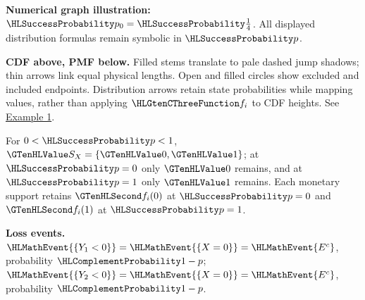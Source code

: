 {\begin{center}
\end{center}
\textbf{Numerical graph illustration:} $\SuccessProb{p_0}=\SuccessProb{\frac{1}{4}}$. All displayed distribution formulas remain symbolic in $\SuccessProb{p}$.
\par\textbf{CDF above, PMF below.} Filled stems translate to pale dashed jump shadows; thin arrows link equal physical lengths. Open and filled circles show excluded and included endpoints. Distribution arrows retain state probabilities while mapping values, rather than applying $\TransformationFunction{f_i}$ to CDF heights. See \hyperref[ex:intro-one]{Example 1}.\par
For $0<\SuccessProb{p}<1$, $\Indicator{S_X}=\{\Indicator{0},\Indicator{1}\}$; at $\SuccessProb{p}=0$ only $\Indicator{0}$ remains, and at $\SuccessProb{p}=1$ only $\Indicator{1}$ remains. Each monetary support retains $\Money{f_i(0)}$ at $\SuccessProb{p}=0$ and $\Money{f_i(1)}$ at $\SuccessProb{p}=1$.
\par\textbf{Loss events.} $\HLMathEvent{\{Y_1<0\}}=\HLMathEvent{\{X=0\}}=\HLMathEvent{E^c}$, probability $\FailureProb{1-p}$; $\HLMathEvent{\{Y_2<0\}}=\HLMathEvent{\{X=0\}}=\HLMathEvent{E^c}$, probability $\FailureProb{1-p}$.
\endgroup
}
